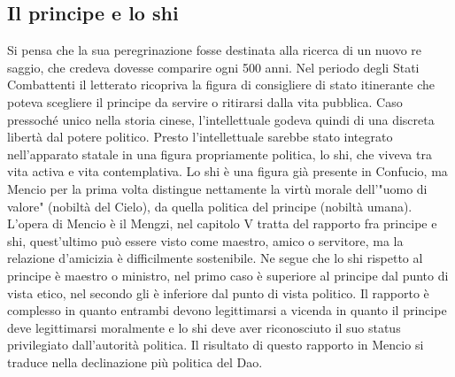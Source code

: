 \documentclass[10pt,a4paper]{report}
\begin{document}
\subsection{Il principe e lo shi}
Si pensa che la sua peregrinazione fosse destinata alla ricerca di un nuovo re saggio, che credeva dovesse comparire ogni 500 anni. Nel periodo degli Stati Combattenti il letterato ricopriva la figura di consigliere di stato itinerante che poteva scegliere il principe da servire o ritirarsi dalla vita pubblica. Caso pressoché unico nella storia cinese, l'intellettuale godeva quindi di una discreta libertà dal potere politico. Presto l'intellettuale sarebbe stato integrato nell'apparato statale in una figura propriamente politica, lo shi, che viveva tra vita activa e vita contemplativa. Lo shi è una figura già presente in Confucio, ma Mencio per la prima volta distingue nettamente la virtù morale dell'"uomo di valore" (nobiltà del Cielo), da quella politica del principe (nobiltà umana).\\
L'opera di Mencio è il Mengzi, nel capitolo V tratta del rapporto fra principe e shi, quest'ultimo può essere visto come maestro, amico o servitore, ma la relazione d'amicizia è difficilmente sostenibile. Ne segue che lo shi rispetto al principe è maestro o ministro,  nel primo caso è superiore al principe dal punto di vista etico, nel secondo gli è inferiore dal punto di vista politico. Il rapporto è complesso in quanto entrambi devono legittimarsi a vicenda in quanto il principe deve legittimarsi moralmente e lo shi deve aver riconosciuto il suo status privilegiato dall'autorità politica. Il risultato di questo rapporto in Mencio si traduce nella declinazione più politica del Dao.  
\end{document}
